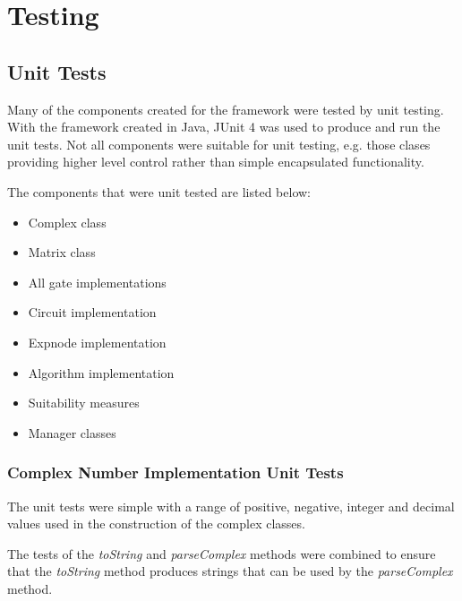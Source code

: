 \chapter{Testing}
\label{sec:testing}
\section{Unit Tests}
\label{sec:unittests}
Many of the components created for the framework were tested by unit testing.
With the framework created in Java, JUnit 4\cite{junitweb} was used to produce and run the unit tests.
Not all components were suitable for unit testing, e.g. those clases providing higher level control rather than simple encapsulated functionality.

The components that were unit tested are listed below:
\begin{itemize}
 \item Complex class
 \item Matrix class
 \item All gate implementations
 \item Circuit implementation
 \item Expnode implementation
 \item Algorithm implementation
 \item Suitability measures
 \item Manager classes
\end{itemize}


\subsection{Complex Number Implementation Unit Tests}
The unit tests were simple with a range of positive, negative, integer and decimal values used in the construction of the complex classes.

The tests of the \emph{toString} and \emph{parseComplex} methods were combined to ensure that the \emph{toString} method produces strings that can be used by the \emph{parseComplex} method.

